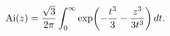 \[\mathop{\mathrm{Ai}\/}\nolimits\!\left(z\right)=\frac{\sqrt{3}}{2\pi}\int_{0}^%
{\infty}\mathop{\exp\/}\nolimits\!\left(-\frac{t^{3}}{3}-\frac{z^{3}}{3t^{3}}%
\right)dt.\]